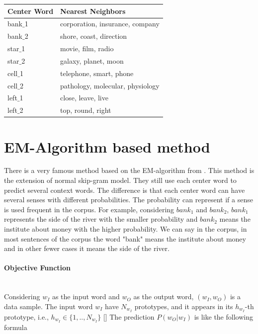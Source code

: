 \begin{center}

 \begin{tabular}{|l|l|}
  \hline
  Center Word &Nearest Neighbors \\
  \hline  
  bank$\_$1 & corporation, insurance, company\\
  \hline
  bank$\_$2 & shore, coast, direction\\
  \hline
  star$\_$1 & movie, film, radio\\
  \hline
  star$\_$2 & galaxy, planet, moon\\
  \hline
  cell$\_$1 & telephone, smart, phone\\
  \hline
  cell$\_$2 & pathology, molecular, physiology\\
  \hline
  left$\_$1 & close, leave, live\\
  \hline
  left$\_$2 & top, round, right\\
  \hline
 \end{tabular}
\end{center}
\section{EM-Algorithm based method}


There is a very famous method based on the EM-algorithm from \cite{tian2014probabilistic}. This method is the extension of normal skip-gram model. They still use each center word to predict several context words. The difference is that each center word can have several senses with different probabilities. The probability can represent if a sense is used frequent in the corpus. For example, considering $bank_1$ and $bank_2$, $bank_1$ represents the side of the river with the smaller probability and $bank_2$ means the institute about money with the higher probability. We can say in the corpus, in most sentences of the corpus the word "bank" means the institute about money and in other fewer cases it means the side of the river. \\

\paragraph{Objective Function}\ \\

Considering $w_I$ as the input word and $w_O$ as the output word, $(w_I,w_O)$ is a data sample. The input word $w_I$ have $N_{w_I}$ prototypes, and it appears in its $h_{w_I}$-th prototype, i.e., $h_{w_I}\in \{1,..,N_{w_I}\}$ [] The prediction $P(w_O|w_I)$ is like the following formula

